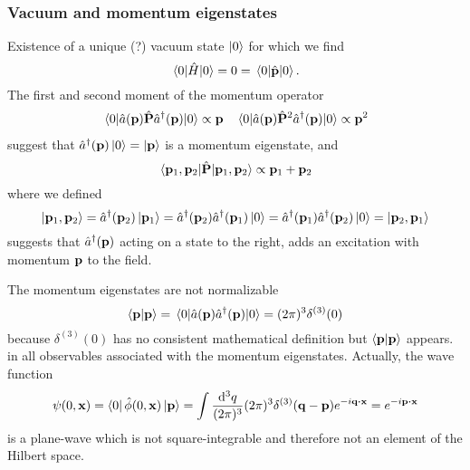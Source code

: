 \subsubsection{Vacuum and momentum eigenstates}
Existence of a unique (?) vacuum state $\ket{0}$ for which we find
\begin{equation}
	\expval{\hat{H}}{0}
	=
	0
	=
	\expval{\hat{\vb{p}}}{0}
	\label{eq:qkg_expval_energy_momentum_vacuum}.
\end{equation}
The first and second moment of the momentum operator
\begin{align}
	\expval{\hat{a}(\vb{p})\hat{\vb{P}}\hat{a}^\dagger(\vb{p})}{0}
	\propto
	\vb{p}
	&&
	\expval{\hat{a}(\vb{p})\hat{\vb{P}}^2\hat{a}^\dagger(\vb{p})}{0}
	\propto
	\vb{p}^2
\end{align}
suggest that $\hat{a}^\dagger(\vb{p})\ket{0}=\ket{\vb{p}}$ is a momentum eigenstate, and
\begin{equation}
	\expval{\hat{\vb{P}}}{\vb{p}_1,\vb{p}_2}
	\propto
	\vb{p}_1+\vb{p}_2
\end{equation}
where we defined
\begin{equation}
	\ket{\vb{p}_1,\vb{p}_2}
	=
	\hat{a}^\dagger(\vb{p}_2)\ket{\vb{p}_1}
	=
	\hat{a}^\dagger(\vb{p}_2)\hat{a}^\dagger(\vb{p}_1)\ket{0}
	=
	\hat{a}^\dagger(\vb{p}_1)\hat{a}^\dagger(\vb{p}_2)\ket{0}
	=
	\ket{\vb{p}_2,\vb{p}_1}
\end{equation}
suggests that $\hat{a}^\dagger(\vb{p})$ acting on a state to the right, adds an excitation with momentum $\vb{p}$ to the field.

The momentum eigenstates are not normalizable
\begin{equation}
	\bra{\vb{p}}\ket{\vb{p}}
	=
	\expval{\hat{a}(\vb{p})\hat{a}^\dagger(\vb{p})}{0}
	=
	(2\pi)^3\delta^{(3)}(0)
\end{equation}
because $\delta^{(3)}(0)$ has no consistent mathematical definition but $\bra{\vb{p}}\ket{\vb{p}}$ appears. in all observables associated with the momentum eigenstates.
Actually, the wave function
\begin{equation}
	\psi(0,\vb{x})
	=
	\bra{0}\hat\phi(0,\vb{x})\ket{\vb{p}}
	=
	\int\frac{\dd[3]{q}}{(2\pi)^3}
	(2\pi)^3\delta^{(3)}(\vb{q}-\vb{p})
	e^{-i\vb{q}\vdot\vb{x}}
	=
	e^{-i\vb{p}\vdot\vb{x}}
\end{equation}
is a plane-wave which is not square-integrable and therefore not an element of the Hilbert space.

